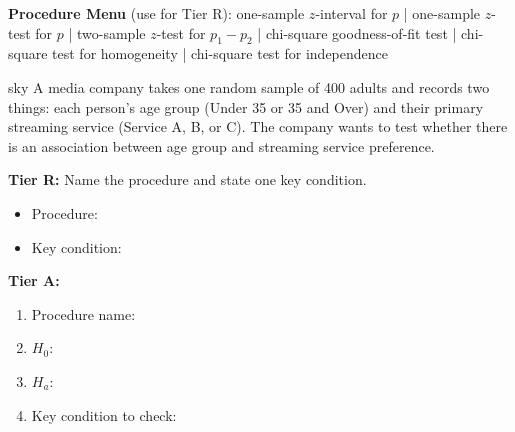 \documentclass[10pt]{article}
\begin{document}
\namepartnerperiod

\vspace{0.08in}

\textbf{Procedure Menu} (use for Tier R): one-sample $z$-interval for $p$ \;|\;
one-sample $z$-test for $p$ \;|\; two-sample $z$-test for $p_1-p_2$ \;|\;
chi-square goodness-of-fit test \;|\;
chi-square test for homogeneity \;|\;
chi-square test for independence

\vspace{0.06in}

\begin{scenariobox}{sky}
A media company takes one random sample of 400 adults and records two things: each person's
age group (Under 35 or 35 and Over) and their primary streaming service (Service A, B, or C).
The company wants to test whether there is an association between age group and streaming
service preference.

\textbf{Tier R:} Name the procedure and state one key condition.
\begin{itemize}
  \item Procedure: 
  \item Key condition: 
\end{itemize}

\textbf{Tier A:}
\begin{enumerate}
  \item Procedure name: 
  \item $H_0$: 
  \item $H_a$: 
  \item Key condition to check: 
\end{enumerate}
\end{scenariobox}
\end{document}
